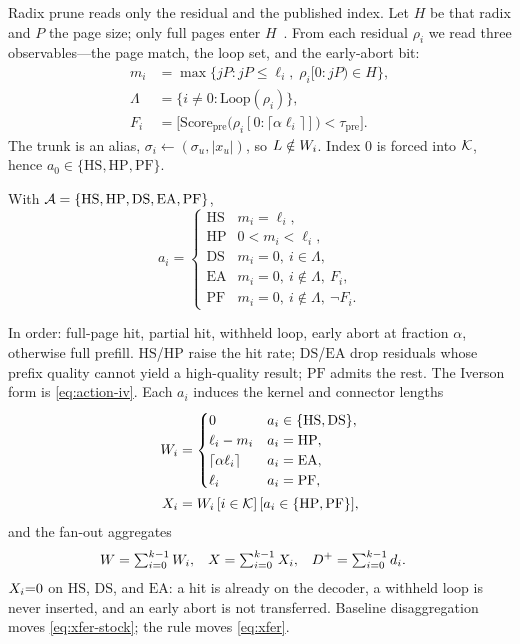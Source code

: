 Radix prune reads only the residual and the published index.
Let $H$ be that radix and $P$ the page size; only full pages enter $H$~\cite{vllm}.
From each residual $\rho_i$ we read three observables---the page match, the loop set, and the early-abort bit:
\begin{align}
m_i &= \max\{jP: jP\le\ell_i,\;\rho_i[0{:}jP)\in H\}, \label{eq:mi}\\
\Lambda &= \{i\neq 0:\mathrm{Loop}(\rho_i)\}, \nonumber\\
F_i &= \bigl[\mathrm{Score}_{\mathrm{pre}}\bigl(\rho_i[0{:}\lceil\alpha\ell_i\rceil]\bigr)<\tau_{\mathrm{pre}}\bigr]. \nonumber
\end{align}
The trunk is an alias, $\sigma_i\leftarrow(\sigma_u,|x_u|)$, so $L\notin W_i$.
Index $0$ is forced into $\mathcal{K}$, hence $a_0\in\{\mathrm{HS},\mathrm{HP},\mathrm{PF}\}$.

\begin{definition}
\label{def:action}
With $\mathcal{A}=\{\mathrm{HS},\mathrm{HP},\mathrm{DS},\mathrm{EA},\mathrm{PF}\}$,
\begin{equation}
\label{eq:action}
a_i=
\begin{cases}
\mathrm{HS} & m_i=\ell_i,\\
\mathrm{HP} & 0<m_i<\ell_i,\\
\mathrm{DS} & m_i=0,\ i\in\Lambda,\\
\mathrm{EA} & m_i=0,\ i\notin\Lambda,\ F_i,\\
\mathrm{PF} & m_i=0,\ i\notin\Lambda,\ \neg F_i.
\end{cases}
\end{equation}
\end{definition}

\noindent
In order: full-page hit, partial hit, withheld loop, early abort at fraction $\alpha$, otherwise full prefill.
$\mathrm{HS}$/$\mathrm{HP}$ raise the hit rate; $\mathrm{DS}$/$\mathrm{EA}$ drop residuals whose prefix quality cannot yield a high-quality result; $\mathrm{PF}$ admits the rest.
The Iverson form is \eqref{eq:action-iv}.
Each $a_i$ induces the kernel and connector lengths
\begin{align}
W_i &=
\begin{cases}
0 & a_i\in\{\mathrm{HS},\mathrm{DS}\},\\
\ell_i-m_i & a_i=\mathrm{HP},\\
\lceil\alpha\ell_i\rceil & a_i=\mathrm{EA},\\
\ell_i & a_i=\mathrm{PF},
\end{cases}
\label{eq:work}\\
X_i &= W_i\,[i\in\mathcal{K}]\,[a_i\in\{\mathrm{HP},\mathrm{PF}\}],
\label{eq:xfer}
\end{align}
and the fan-out aggregates
\begin{align}
W &=\textstyle\sum_{i=0}^{k-1}W_i, &
X &=\textstyle\sum_{i=0}^{k-1}X_i, &
D^{+} &=\textstyle\sum_{i=0}^{k-1}d_i.
\label{eq:agg}
\end{align}
$X_i{=}0$ on $\mathrm{HS}$, $\mathrm{DS}$, and $\mathrm{EA}$: a hit is already on the decoder, a withheld loop is never inserted, and an early abort is not transferred.
Baseline disaggregation moves \eqref{eq:xfer-stock}; the rule moves \eqref{eq:xfer}.

